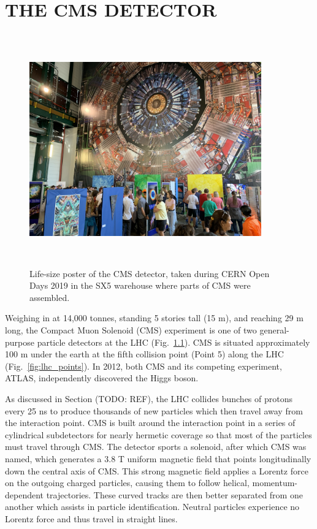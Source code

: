 \chapter{THE CMS DETECTOR} 
\label{ch:cms_detector}
\begin{figure}[pbth]
\centering
\includegraphics[width=10cm,height=10cm,keepaspectratio]{figures/cms/CMS_poster_SX5.jpg}
    \caption{
    Life-size poster of the CMS detector, taken during CERN Open Days 2019
    in the SX5 warehouse where parts of CMS were assembled.}
    \label{fig:cms_poster}
\end{figure}
Weighing in at 14,000 tonnes, standing 5 stories tall (15 m), and reaching 29 m long, the Compact Muon Solenoid (CMS) experiment is one of two general-purpose particle detectors at the LHC (Fig.~\ref{fig:cms_poster}).
CMS is situated approximately 100 m under the earth at the fifth collision point (Point 5) along the LHC (Fig.~\ref{fig:lhc_points}).
In 2012, both CMS and its competing experiment, ATLAS, independently discovered the Higgs boson.

As discussed in Section (TODO: REF), the LHC collides bunches of protons every 25 ns to produce thousands of new particles which then travel away from the interaction point.
CMS is built around the interaction point in a series of cylindrical subdetectors for nearly hermetic coverage so that most of the particles must travel through CMS.
The detector sports a solenoid, after which CMS was named, which generates a 3.8 T uniform magnetic field that points longitudinally down the central axis of CMS.
This strong magnetic field applies a Lorentz force on the outgoing charged particles, causing them to follow helical, momentum-dependent trajectories.
These curved tracks are then better separated from one another which assists in particle identification.
Neutral particles experience no Lorentz force and thus travel in straight lines.

